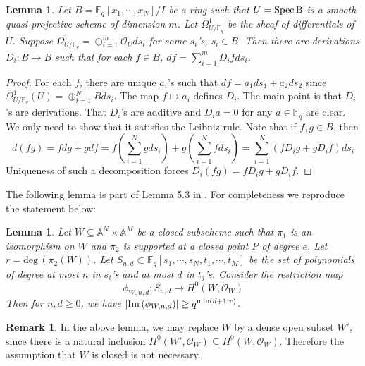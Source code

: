 \documentclass[12pt]{article}
\theoremstyle{plain}
\newtheorem{lemma}[equation]{Lemma}
\theoremstyle{definition}
\newtheorem{remark}[equation]{Remark}
\newcommand{\IA}{\mathbb{A}}
\newcommand{\IF}{\mathbb{F}}
\newcommand{\sO}{\mathcal{O}}
\renewcommand{\deg}{\mathrm{deg}\,}
\newcommand{\Spec}{\rm Spec\,}
\newcommand{\im}{{\rm Im\,}}
\newcommand{\<}{\langle}
\renewcommand{\>}{\rangle}
\newcommand{\Ohm}{\Omega}
\begin{document}
\begin{lemma}
\label{book-keeping}
Let $B = \IF_q[x_1, \cdots, x_N]/I$ be a ring such that $U = \Spec B$ is a smooth quasi-projective scheme of dimension $m$. Let $\Ohm^1_{U/\IF_q}$ be the sheaf of differentials of $U$. Suppose $\Ohm^1_{U/\IF_q} = \oplus_{i = 1}^m \sO_U ds_i$ for some $s_i$'s, $s_i \in B$. Then there are derivations $D_i : B \to B$ such that for each $f \in B$, $df = \sum_{i = 1}^m D_i f ds_i$. 
\end{lemma}
\begin{proof}
For each $f$, there are unique $a_i$'s such that $df = a_1 ds_1 + a_2 ds_2$ since $\Ohm^1_{U/\IF_q}(U) = \oplus_{i = 1}^N B ds_i$. The map $f \mapsto a_i$ defines $D_i$. The main point is that $D_i$'s are derivations. That $D_i$'s are additive and $D_i a = 0$ for any $a \in \IF_q$ are clear. We only need to show that it satisfies the Leibniz rule. Note that if $f, g \in B$, then 
$$ d(fg) = f dg + g df = f(\sum_{i = 1}^N g ds_i) + g(\sum_{i = 1}^N f ds_i) = \sum_{i = 1}^N (f D_i g + g D_i f) ds_i $$
Uniqueness of such a decomposition forces $D_i(fg) = fD_i g + g D_i f$.  
\end{proof}

The following lemma is part of Lemma 5.3 in \cite{Wood}. For completeness we reproduce the statement below: 
\begin{lemma}
\label{5.3}
Let $W \subseteq \IA^N \times \IA^M$ be a closed subscheme such that $\pi_1$ is an isomorphism on $W$ and $\pi_2$ is supported at a closed point $P$ of degree $e$. Let $r = \deg(\pi_2(W))$. Let $S_{n, d} \subset \IF_q[s_1, \cdots, s_N, t_1, \cdots, t_M]$ be the set of polynomials of degree at most $n$ in $s_i$'s and at most $d$ in $t_j$'s. Consider the restriction map 
$$ \phi_{W, n, d} : S_{n, d} \to H^0(W, \sO_W) $$
Then for $n, d \ge 0$, we have $|\im(\phi_{W, n, d})| \ge q^{\min(d+1, r)}$. 
\end{lemma}
\begin{remark}
In the above lemma, we may replace $W$ by a dense open subset $W'$, since there is a natural inclusion $H^0(W', \sO_W) \subseteq H^0(W, \sO_W)$. Therefore the assumption that $W$ is closed is not necessary. 
\end{remark}
\end{document}
